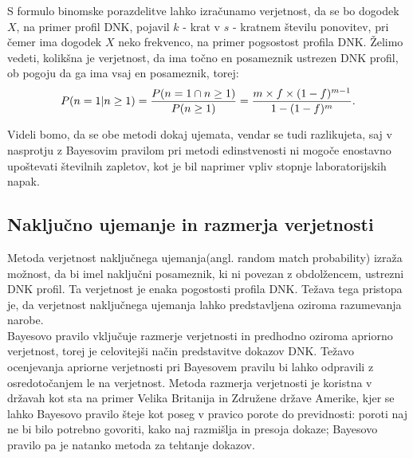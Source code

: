 \documentclass[12pt,a4paper]{amsart}
\theoremstyle{definition} %
\theoremstyle{plain} %
\begin{document}
S formulo binomske porazdelitve lahko izračunamo verjetnost, da se bo dogodek $X$, na primer profil DNK, pojavil $k$ - krat v $s$ - kratnem
številu ponovitev, pri čemer ima dogodek $X$ neko frekvenco, na primer pogsostost profila DNK. Želimo vedeti, kolikšna je verjetnost, da ima 
točno en posameznik ustrezen DNK profil, ob pogoju da ga ima vsaj en posameznik, torej: \vspace{3mm}
\[P(n = 1 \lvert n \ge 1) = \frac{P(n=1 \cap n \ge 1)}{P(n \ge 1)} = \frac{m \times f \times (1 - f)^{m-1}}{1 - (1-f)^m}. \vspace{3mm}\]

Videli bomo, da se obe metodi dokaj ujemata, vendar se tudi razlikujeta, saj v nasprotju 
z Bayesovim pravilom pri metodi edinstvenosti ni mogoče enostavno upoštevati številnih zapletov, kot je bil naprimer vpliv stopnje 
laboratorijskih napak. \\

\subsection{Naključno ujemanje in razmerja verjetnosti}
Metoda verjetnost naključnega ujemanja(angl. random match probability) izraža možnost, da bi imel naključni posameznik, ki ni povezan z obdolžencem,
ustrezni DNK profil. Ta verjetnost je enaka pogostosti profila DNK. Težava tega pristopa je, da verjetnost naključnega ujemanja lahko predstavljena
oziroma razumevanja narobe. \\
 
Bayesovo pravilo vključuje razmerje verjetnosti in predhodno oziroma apriorno verjetnost, torej je celovitejši način predstavitve dokazov DNK.
Težavo ocenjevanja apriorne verjetnosti pri Bayesovem pravilu bi lahko odpravili z osredotočanjem le na verjetnost. Metoda razmerja verjetnosti je
koristna v državah kot sta na primer Velika Britanija in Združene države Amerike, kjer se lahko Bayesovo pravilo šteje kot poseg v pravico porote
do previdnosti: poroti naj ne bi bilo potrebno govoriti, kako naj razmišlja in presoja dokaze; Bayesovo pravilo pa je natanko metoda za
tehtanje dokazov. \vspace{3mm}

\end{document}
